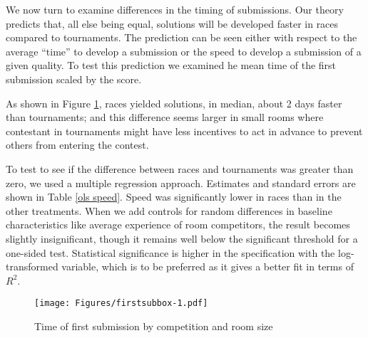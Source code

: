 \documentclass[10pt, titlepage]{article}
\begin{document}
We now turn to examine differences in the timing of submissions. Our
theory predicts that, all else being equal, solutions will be developed
faster in races compared to tournaments. The prediction can be seen
either with respect to the average ``time'' to develop a submission or
the speed to develop a submission of a given quality. To test this
prediction we examined he mean time of the first submission scaled by
the score.

As shown in Figure \ref{room time}, races yielded solutions, in median,
about 2 days faster than tournaments; and this difference seems larger
in small rooms where contestant in tournaments might have less
incentives to act in advance to prevent others from entering the
contest.

To test to see if the difference between races and tournaments was
greater than zero, we used a multiple regression approach. Estimates and
standard errors are shown in Table \ref{ols speed}. Speed was
significantly lower in races than in the other treatments. When we add
controls for random differences in baseline characteristics like average
experience of room competitors, the result becomes slightly
insignificant, though it remains well below the significant threshold
for a one-sided test. Statistical significance is higher in the
specification with the log-transformed variable, which is to be
preferred as it gives a better fit in terms of \(R^2\).

\begin{figure}
\caption{Time of first submission by competition and room size}
\label{room time}
\texttt{[image: Figures/firstsubbox-1.pdf]}
\end{figure}
\end{document}

